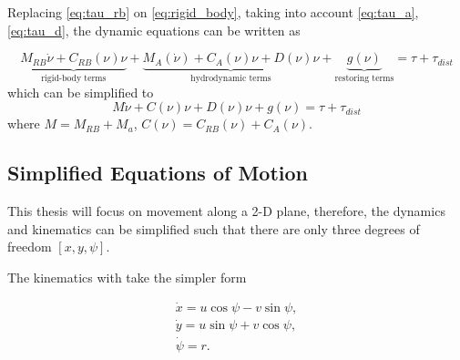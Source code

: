 \par Replacing \eqref{eq:tau_rb} on \eqref{eq:rigid_body}, taking into account \eqref{eq:tau_a}, \eqref{eq:tau_d}, the dynamic equations can
be written as

\begin{equation}
    \underbrace{M_{RB}\dot{\nu} + C_{RB}(\nu)\nu}_{\text{rigid-body terms}} + \underbrace{M_A(\dot{\nu}) + C_A(\nu)\nu + D(\nu)\nu}_{\text{hydrodynamic terms}} + \underbrace{g(\nu)}_{\text{restoring terms}} = \tau + \tau_{dist}
\end{equation}
which can be simplified to
\begin{equation}
    M\dot{\nu} + C(\nu)\nu + D(\nu)\nu + g(\nu) = \tau + \tau_{dist}
\end{equation}
where $M = M_{RB} + M_a$, $C(\nu) = C_{RB}(\nu) + C_A(\nu)$.

\subsection{Simplified Equations of Motion}

\par This thesis will focus on movement along a 2-D plane, therefore, the dynamics and kinematics can be simplified such that there are only three degrees of freedom $[x,y,\psi]$.
\par The kinematics with take the simpler form 

\begin{equation}
    \begin{gathered}
        \dot{x} = u \cos \psi - v \sin \psi, \\
        \dot{y} = u \sin \psi + v \cos \psi, \\
        \dot{\psi} = r.
    \end{gathered}
\end{equation}

